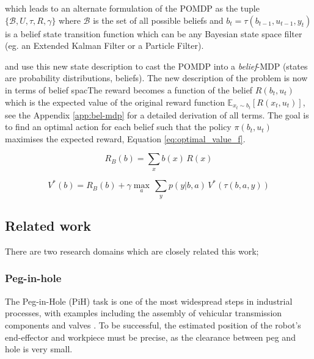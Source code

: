 \documentclass[final,5p,times,twocolumn]{elsarticle}
\begin{document}
which leads to an alternate formulation of the POMDP as the tuple  $\{\mathcal{B},U,\tau,R,\gamma\}$ where 
$\mathcal{B}$ is the set of all possible beliefs and $b_t = \tau(b_{t-1},u_{t-1},y_t)$ is a belief state transition function 
which can be any Bayesian state space filter (eg. an Extended Kalman Filter or a Particle Filter).



and use this new state description to cast the POMDP into a \textit{belief}-MDP (states are probability distributions, beliefs). 
The new description of the problem is now in terms of belief spacThe reward becomes a function of the belief $R(b_t,u_t)$ which is the expected value of the original 
reward function $\mathbb{E}_{x_t \sim b_t}[R(x_t,u_t)]$, see the Appendix \ref{app:bel-mdp} for a detailed derivation of all terms. The goal is to find an 
optimal action for each belief such that the policy $\pi(b_t,u_t)$ maximises the expected reward, Equation \ref{eq:optimal_value_f}.

\begin{equation}
  R_B(b) = \sum\limits_{x} b(x)\, R(x)
\end{equation}


\begin{equation}
  V^{*}(b) = R_B(b) + \gamma \max\limits_{a}\, \sum\limits_{y} p(y|b,a)\, V^*(\tau(b,a,y))
\end{equation}



%


%
%
% 
%
%
%

\subsection{Related work}
There are two research domains which are closely related this work;
\subsubsection{Peg-in-hole}

The Peg-in-Hole (PiH) task is one of the most widespread steps in industrial processes, 
with examples including the assembly of vehicular transmission components \cite{search_strategies_icra_2001} and 
valves \cite{online_gpr_icra_2014}. To be successful, the estimated position of the robot's end-effector 
and workpiece must be precise, as the clearance between peg and hole is very small.
\end{document}
